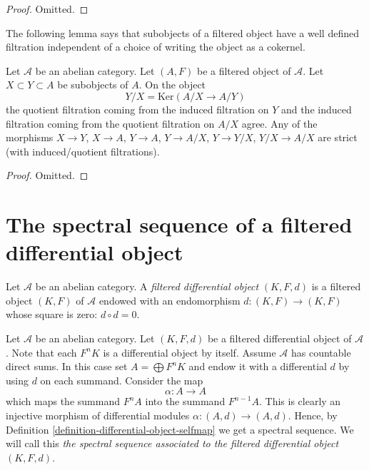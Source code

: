 \begin{proof}
Omitted.
\end{proof}

\noindent
The following lemma says that subobjects of a filtered object have a well
defined filtration independent of a choice of writing the object as a
cokernel.

\begin{lemma}
\label{lemma-filtration-subobject}
Let $\mathcal{A}$ be an abelian category.
Let $(A, F)$ be a filtered object of $\mathcal{A}$.
Let $X \subset Y \subset A$ be subobjects of $A$.
On the object
$$
Y/X = \text{Ker}(A/X \to A/Y)
$$
the quotient filtration coming from the induced filtration on $Y$ and the
induced filtration coming from the quotient filtration on $A/X$ agree.
Any of the morphisms $X \to Y$, $X \to A$, $Y \to A$, $Y \to A/X$,
$Y \to Y/X$, $Y/X \to A/X$ are strict (with induced/quotient filtrations).
\end{lemma}

\begin{proof}
Omitted.
\end{proof}












\section{The spectral sequence of a filtered differential object}
\label{section-filtered-differential}

\begin{definition}
\label{definition-filtered-differential}
Let $\mathcal{A}$ be an abelian category.
A {\it filtered differential object} $(K, F, d)$ is a filtered object
$(K, F)$ of $\mathcal{A}$ endowed with an endomorphism
$d : (K, F) \to (K, F)$ whose square is zero: $d \circ d = 0$.
\end{definition}

\noindent
Let $\mathcal{A}$ be an abelian category.
Let $(K, F, d)$ be a filtered differential object of $\mathcal{A}$.
Note that each $F^nK$ is a differential object by itself.
Assume $\mathcal{A}$ has countable direct sums.
In this case set $A = \bigoplus F^nK$ and endow it with a differential
$d$ by using $d$ on each summand. Consider the map
$$
\alpha : A \to A
$$
which maps the summand $F^nA$ into the summand
$F^{n - 1}A$. This is clearly an injective morphism of differential
modules $\alpha : (A, d) \to (A, d)$. Hence, by
Definition \ref{definition-differential-object-selfmap}
we get a spectral sequence.
We will call this {\it the spectral sequence associated to
the filtered differential object $(K, F, d)$}.

